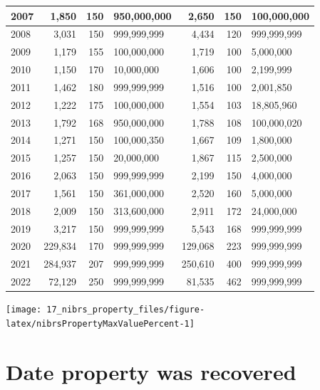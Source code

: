 \documentclass[
]{krantz}
\let\origfigure\figure
\let\endorigfigure\endfigure
\renewenvironment{figure}[1][2] {
    \expandafter\origfigure\expandafter[H]
} {
    \endorigfigure
}
\begin{document}
\begin{longtable}[t]{l|r|r|l|r|r|l}
\hline
2007 & 1,850 & 150 & 950,000,000 & 2,650 & 150 & 100,000,000\\
\hline
2008 & 3,031 & 150 & 999,999,999 & 4,434 & 120 & 999,999,999\\
\hline
2009 & 1,179 & 155 & 100,000,000 & 1,719 & 100 & 5,000,000\\
\hline
2010 & 1,150 & 170 & 10,000,000 & 1,606 & 100 & 2,199,999\\
\hline
2011 & 1,462 & 180 & 999,999,999 & 1,516 & 100 & 2,001,850\\
\hline
2012 & 1,222 & 175 & 100,000,000 & 1,554 & 103 & 18,805,960\\
\hline
2013 & 1,792 & 168 & 950,000,000 & 1,788 & 108 & 100,000,020\\
\hline
2014 & 1,271 & 150 & 100,000,350 & 1,667 & 109 & 1,800,000\\
\hline
2015 & 1,257 & 150 & 20,000,000 & 1,867 & 115 & 2,500,000\\
\hline
2016 & 2,063 & 150 & 999,999,999 & 2,199 & 150 & 4,000,000\\
\hline
2017 & 1,561 & 150 & 361,000,000 & 2,520 & 160 & 5,000,000\\
\hline
2018 & 2,009 & 150 & 313,600,000 & 2,911 & 172 & 24,000,000\\
\hline
2019 & 3,217 & 150 & 999,999,999 & 5,543 & 168 & 999,999,999\\
\hline
2020 & 229,834 & 170 & 999,999,999 & 129,068 & 223 & 999,999,999\\
\hline
2021 & 284,937 & 207 & 999,999,999 & 250,610 & 400 & 999,999,999\\
\hline
2022 & 72,129 & 250 & 999,999,999 & 81,535 & 462 & 999,999,999\\
\hline
\end{longtable}

\begin{figure}

{\centering \texttt{[image: 17\_nibrs\_property\_files/figure-latex/nibrsPropertyMaxValuePercent-1]} 

}

\caption{Annual percent of the value of all property stolen that is made up of the value that is the maximum dollar amount reported in that year, 1991-2022.}\label{fig:nibrsPropertyMaxValuePercent}
\end{figure}

\section{Date property was
recovered}\label{date-property-was-recovered}
\end{document}
